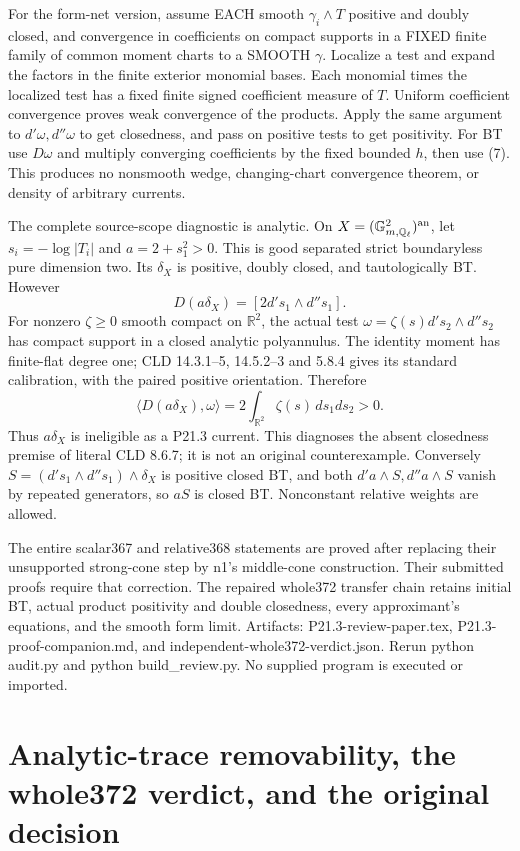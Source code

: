 \documentclass[11pt]{article}
\begin{document}
For the form-net version, assume EACH smooth \(\gamma_i\wedge T\) positive and doubly closed, and convergence in coefficients on compact supports in a FIXED finite family of common moment charts to a SMOOTH \(\gamma\). Localize a test and expand the factors in the finite exterior monomial bases. Each monomial times the localized test has a fixed finite signed coefficient measure of \(T\). Uniform coefficient convergence proves weak convergence of the products. Apply the same argument to \(d'\omega,d''\omega\) to get closedness, and pass on positive tests to get positivity. For BT use \(D\omega\) and multiply converging coefficients by the fixed bounded \(h\), then use (7). This produces no nonsmooth wedge, changing-chart convergence theorem, or density of arbitrary currents.

The complete source-scope diagnostic is analytic. On \(X=(\mathbb G_{m,\mathbb Q_\ell}^2)^{\rm an}\), let \(s_i=-\log|T_i|\) and \(a=2+s_1^2>0\). This is good separated strict boundaryless pure dimension two. Its \(\delta_X\) is positive, doubly closed, and tautologically BT. However
\[
 D(a\delta_X)=[2d's_1\wedge d''s_1].
\]
For nonzero \(\zeta\geq0\) smooth compact on \(\mathbb R^2\), the actual test \(\omega=\zeta(s)d's_2\wedge d''s_2\) has compact support in a closed analytic polyannulus. The identity moment has finite-flat degree one; CLD 14.3.1--5, 14.5.2--3 and 5.8.4 gives its standard calibration, with the paired positive orientation. Therefore
\[
 \langle D(a\delta_X),\omega\rangle=2\int_{\mathbb R^2}\zeta(s)\,ds_1ds_2>0.
\]
Thus \(a\delta_X\) is ineligible as a P21.3 current. This diagnoses the absent closedness premise of literal CLD 8.6.7; it is not an original counterexample. Conversely \(S=(d's_1\wedge d''s_1)\wedge\delta_X\) is positive closed BT, and both \(d'a\wedge S,d''a\wedge S\) vanish by repeated generators, so \(aS\) is closed BT. Nonconstant relative weights are allowed.

The entire scalar367 and relative368 statements are proved after replacing their unsupported strong-cone step by n1's middle-cone construction. Their submitted proofs require that correction. The repaired whole372 transfer chain retains initial BT, actual product positivity and double closedness, every approximant's equations, and the smooth form limit. Artifacts: P21.3-review-paper.tex, P21.3-proof-companion.md, and independent-whole372-verdict.json. Rerun python audit.py and python build\_review.py. No supplied program is executed or imported.

\section{Analytic-trace removability, the whole372 verdict, and the original decision}
\end{document}
